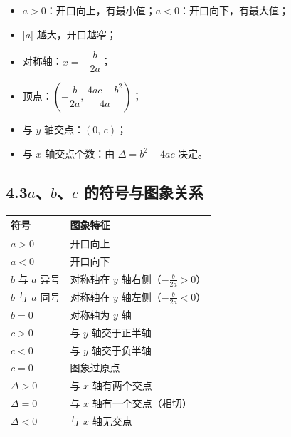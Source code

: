 \documentclass[12pt, a4paper]{ctexart}
\begin{document}
\begin{knowledgebox}[图象特征速查]
\begin{itemize}
  \item $a>0$：开口向上，有最小值；$a<0$：开口向下，有最大值；
  \item $|a|$ 越大，开口越窄；
  \item 对称轴：$x=-\dfrac{b}{2a}$；
  \item 顶点：$\left(-\dfrac{b}{2a},\,\dfrac{4ac-b^2}{4a}\right)$；
  \item 与 $y$ 轴交点：$(0,\,c)$；
  \item 与 $x$ 轴交点个数：由 $\Delta=b^2-4ac$ 决定。
\end{itemize}
\end{knowledgebox}

\subsection*{4.3\quad $a$、$b$、$c$ 的符号与图象关系}

\begin{knowledgebox}[看图识符号]
\renewcommand{\arraystretch}{1.4}
\begin{center}
\begin{tabular}{l l}
\toprule
符号 & 图象特征 \\
\midrule
$a>0$ & 开口向上 \\
$a<0$ & 开口向下 \\
$b$ 与 $a$ 异号 & 对称轴在 $y$ 轴右侧（$-\frac{b}{2a}>0$） \\
$b$ 与 $a$ 同号 & 对称轴在 $y$ 轴左侧（$-\frac{b}{2a}<0$） \\
$b=0$ & 对称轴为 $y$ 轴 \\
$c>0$ & 与 $y$ 轴交于正半轴 \\
$c<0$ & 与 $y$ 轴交于负半轴 \\
$c=0$ & 图象过原点 \\
$\Delta>0$ & 与 $x$ 轴有两个交点 \\
$\Delta=0$ & 与 $x$ 轴有一个交点（相切） \\
$\Delta<0$ & 与 $x$ 轴无交点 \\
\bottomrule
\end{tabular}
\end{center}
\end{knowledgebox}
\end{document}
